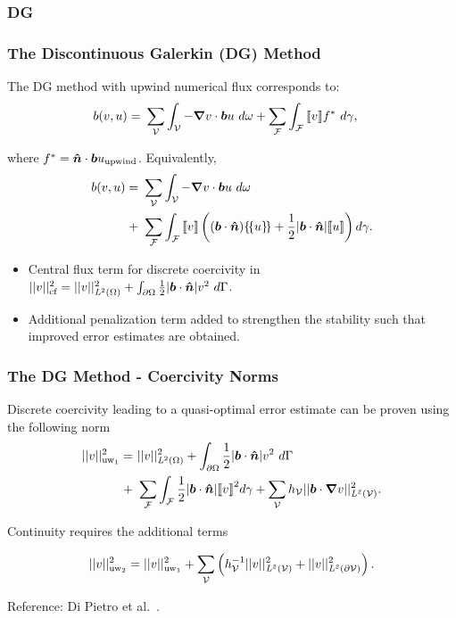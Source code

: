 \subsubsection{DG}

\begin{frame}
\frametitle{The Discontinuous Galerkin (DG) Method}

The DG method with upwind numerical flux corresponds to:
\begin{align}
b(v,u)
=\ & \sum_{\fe{V}} \int_{\fe{V}} - \nabla v \cdot \varv{b} u\ d\omega
+ \sum_{\fe{F}} \int_{\fe{F}} \jump{v} f^*\ d\gamma,
\end{align}

where $f^* = \mathit{\bm{{\hat{n}}}} \cdot \mathit{\bm{{b}}} u_\text{upwind}$. Equivalently,
\begin{align}
b(v,u)
=\ & \sum_{\fe{V}} \int_{\fe{V}} - \nabla v \cdot \varv{b} u\ d\omega \\
  +\ & \sum_{\fe{F}} \int_{\fe{F}} \jump{v}
       \left(
       (\varv{b} \cdot \varv{\hat{n}}) \avg{u} +
       \frac{1}{2} |\varv{b} \cdot \varv{\hat{n}}| \jump{u}
       \right) d\gamma.
\end{align}

\begin{itemize}
  \item Central flux term for discrete coercivity in $||v||^2_\text{cf} =
    ||v||^2_{\mathit{{{L}}}^2(\Omega)} + \int_{\partial \Omega} \frac{1}{2}
    |\mathit{\bm{{b}}} \cdot \mathit{\bm{{\hat{n}}}}| v^2\ d\Gamma$.
  \item Additional penalization term added to strengthen the stability such that
    improved error estimates are obtained.
\end{itemize}

\end{frame}

\begin{frame}
\frametitle{The DG Method - Coercivity Norms}

Discrete coercivity leading to a quasi-optimal error estimate can be proven
using the following norm
\begin{align}
  ||v||^2_\text{uw$_1$}
  =\ &
  ||v||^2_{\fspace{L}^2(\Omega)}
  +
  \int_{\partial \Omega} \frac{1}{2} |\varv{b} \cdot \varv{\hat{n}}| v^2\ d\Gamma \\
  +\ &
  \sum_{\fe{F}} \int_{\fe{F}} \frac{1}{2} |\varv{b} \cdot \varv{\hat{n}}| \jump{v}^2 d\gamma
  +
  \sum_{\fe{V}} h_\fe{V} || \varv{b} \cdot \nabla v ||^2_{\fspace{L^2(\fe{V})}}.
\end{align}

Continuity requires the additional terms

\begin{align}
  ||v||^2_\text{uw$_2$}
  =
  ||v||^2_\text{uw$_1$}
  +
  \sum_{\mathcal{{{V}}}} \left( h_{\mathcal{{{V}}}}^{-1} || v ||^2_{\mathit{{{L^2(\mathcal{{{V}}})}}}} + || v ||^2_{\mathit{{{L^2(\partial \mathcal{{{V}}})}}}} \right).
\end{align}

Reference: Di Pietro et al.~\cite{DiPietro2011}.

\end{frame}
